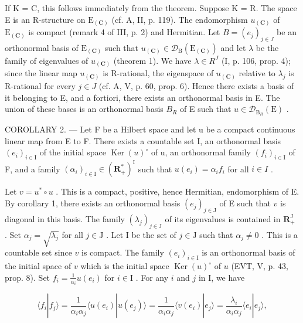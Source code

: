 If K = C, this follows immediately from the theorem. Suppose K = R. The space E is an R-structure on \(\mathrm{E}_{(\mathbf{C})}\) (cf. A, II, p. 119). The endomorphism \(u_{(\mathbf{C})}\) of \(\mathrm{E}_{(\mathbf{C})}\) is compact (remark 4 of III, p. 2) and Hermitian. Let \(B = (e_j)_{j \in J}\) be an orthonormal basis of \(\mathrm{E}_{(\mathbf{C})}\) such that \(u_{(\mathbf{C})} \in \mathcal{D}_{\mathrm{B}}(\mathrm{E}_{(\mathbf{C})})\) and let \(\lambda\) be the family of eigenvalues of \(u_{(\mathbf{C})}\) (theorem 1). We have \(\lambda \in R^{J}\) (I, p. 106, prop. 4); since the linear map \(u_{(\mathbf{C})}\) is R-rational, the eigenspace of \(u_{(\mathbf{C})}\) relative to \(\lambda_j\) is R-rational for every \(j \in J\) (cf. A, V, p. 60, prop. 6). Hence there exists a basis of it belonging to E, and a fortiori, there exists an orthonormal basis in E. The union of these bases is an orthonormal basis \(B_R\) of E such that \(u \in \mathcal{D}_{\mathrm{B}_R}(\mathrm{E})\) .

COROLLARY 2. --- Let F be a Hilbert space and let u be a compact continuous linear map from E to F. There exists a countable set I, an orthonormal basis \((e_{i})_{i\in\mathrm{I}}\) of the initial space \(\operatorname{Ker}(u)^{\circ}\) of u, an orthonormal family \((f_{i})_{i\in\mathrm{I}}\) of F, and a family \((\alpha_{i})_{i\in\mathrm{I}}\in(\mathbf{R}_{+}^{*})^{\mathrm{I}}\) such that \(u(e_{i})=\alpha_{i}f_{i}\) for all \(i\in I\) .

Let \(v = u^{*} \circ u\) . This is a compact, positive, hence Hermitian, endomorphism of E. By corollary 1, there exists an orthonormal basis \((e_{j})_{j \in \mathrm{J}}\) of E such that \(v\) is diagonal in this basis. The family \((\lambda_{j})_{j \in \mathrm{J}}\) of its eigenvalues is contained in \(\mathbf{R}_{+}^{\mathrm{J}}\) . Set \(\alpha_{j} = \sqrt{\lambda_{j}}\) for all \(j \in \mathrm{J}\) . Let I be the set of \(j \in \mathrm{J}\) such that \(\alpha_{j} \neq 0\) . This is a countable set since \(v\) is compact. The family \((e_{i})_{i \in \mathrm{I}}\) is an orthonormal basis of the initial space of \(v\) which is the initial space \(\operatorname{Ker}(u)^{\circ}\) of \(u\) (EVT, V, p. 43, prop. 8). Set \(f_{i} = \frac{1}{\alpha_{i}} u(e_{i})\) for \(i\in \mathrm{I}\) . For any \(i\) and \(j\) in I, we have

\[
\langle f _ {i} | f _ {j} \rangle = \frac {1}{\alpha_ {i} \alpha_ {j}} \langle u (e _ {i}) | u (e _ {j}) \rangle = \frac {1}{\alpha_ {i} \alpha_ {j}} \langle v (e _ {i}) | e _ {j} \rangle = \frac {\lambda_ {i}}{\alpha_ {i} \alpha_ {j}} \langle e _ {i} | e _ {j} \rangle ,
\]

